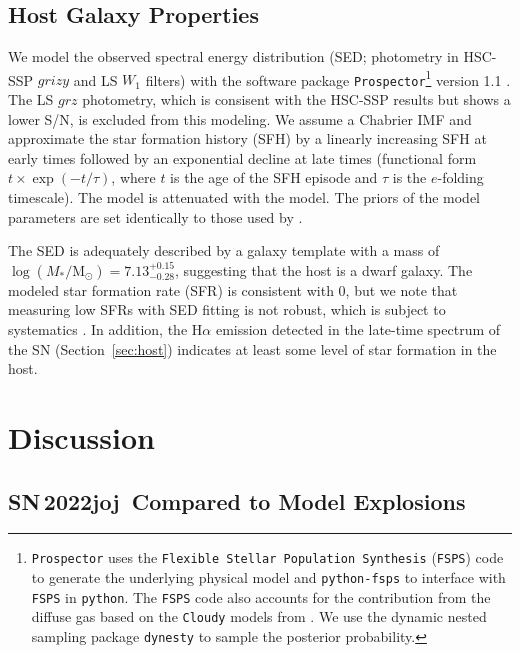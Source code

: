 \documentclass[twocolumn]{aastex631}
\newcommand{\sn}{SN\,2022joj}
\begin{document}
\begin{CJK*}{UTF8}{gbsn}


\subsection{Host Galaxy Properties}
We model the observed spectral energy distribution (SED; photometry in HSC-SSP $grizy$ and LS $W_1$ filters) with the software package \texttt{Prospector}\footnote{\texttt{Prospector} uses the \texttt{Flexible Stellar Population Synthesis} (\texttt{FSPS}) code \citep{Conroy2009a} to generate the underlying physical model and \texttt{python-fsps} \citep{ForemanMackey2014a} to interface with \texttt{FSPS} in \texttt{python}. The \texttt{FSPS} code also accounts for the contribution from the diffuse gas based on the \texttt{Cloudy} models from \citet{Byler2017a}. We use the dynamic nested sampling package \texttt{dynesty} \citep{Speagle2020a} to sample the posterior probability.} version 1.1 \citep{Johnson2021a}. The LS $grz$ photometry, which is consisent with the HSC-SSP results but shows a lower S/N, is excluded from this modeling. We assume a Chabrier IMF \citep{Chabrier2003a} and approximate the star formation history (SFH) by a linearly increasing SFH at early times followed by an exponential decline at late times (functional form $t \times \exp\left(-t/\tau\right)$, where $t$ is the age of the SFH episode and $\tau$ is the $e$-folding timescale). The model is attenuated with the \citet{Calzetti2000a} model. The priors of the model parameters are set identically to those used by \citet{Schulze2021a}. 

The SED is adequately described by a galaxy template with a mass of $\log(M_*/\mathrm{M_\odot}) = 7.13^{+0.15}_{-0.28}$, suggesting that the host is a dwarf galaxy. The modeled star formation rate (SFR) is consistent with 0, but we note that measuring low SFRs with SED fitting is not robust, which is subject to systematics \citep{Conroy_2013}. In addition, the H$\alpha$ emission detected in the late-time spectrum of the SN (Section~\ref{sec:host}) indicates at least some level of star formation in the host.

\section{Discussion} \label{sec:discussion}
\subsection{\sn\ Compared to Model Explosions} \label{sec:model}


\end{CJK*}
\end{document}
